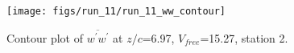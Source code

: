 \begin{figure}[H]
\centering
\texttt{[image: figs/run\_11/run\_11\_ww\_contour]}
\caption{Contour plot of $\overline{w^\prime w^\prime}$ at $z/c$=6.97, $V_{free}$=15.27, station 2.}
\label{fig:run_11_ww_contour}
\end{figure}


